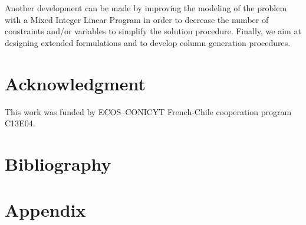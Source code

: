 Another development can be made by improving the modeling of the
problem with a Mixed Integer Linear Program in order to decrease the
number of constraints and/or variables to simplify the solution
procedure. Finally, we aim at designing extended formulations and to
develop column generation procedures.

\section*{Acknowledgment}

This work was funded by ECOS--CONICYT French-Chile cooperation program
C13E04.

\newpage
\section*{Bibliography}
\begin{bibunit}[alpha]
\nocite{IESM}
\nocite*
\putbib[IESM]
\end{bibunit}

\newpage
\section*{Appendix}
~


